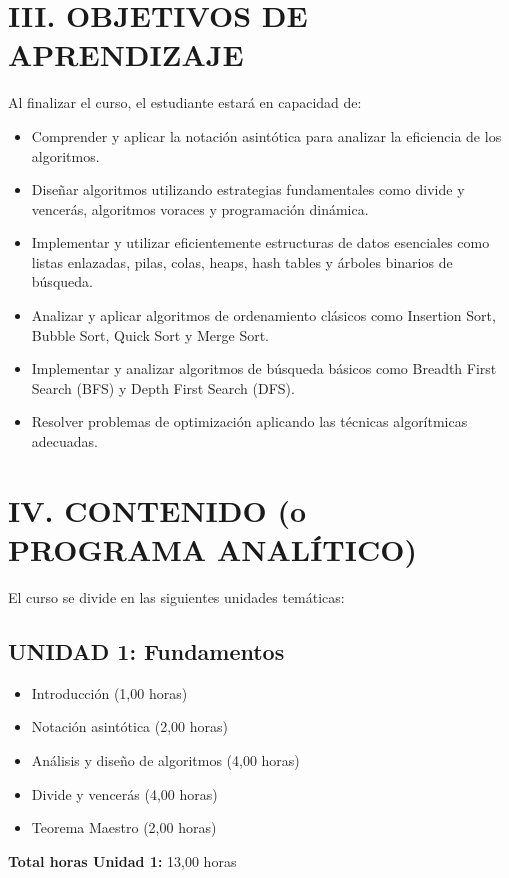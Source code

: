 \documentclass[12pt,a4paper]{article}
\begin{document}
\section*{III. OBJETIVOS DE APRENDIZAJE} %
Al finalizar el curso, el estudiante estará en capacidad de:
\begin{itemize}[leftmargin=*]
    \item Comprender y aplicar la notación asintótica para analizar la eficiencia de los algoritmos.
    \item Diseñar algoritmos utilizando estrategias fundamentales como divide y vencerás, algoritmos voraces y programación dinámica.
    \item Implementar y utilizar eficientemente estructuras de datos esenciales como listas enlazadas, pilas, colas, heaps, hash tables y árboles binarios de búsqueda.
    \item Analizar y aplicar algoritmos de ordenamiento clásicos como Insertion Sort, Bubble Sort, Quick Sort y Merge Sort.
    \item Implementar y analizar algoritmos de búsqueda básicos como Breadth First Search (BFS) y Depth First Search (DFS).
    \item Resolver problemas de optimización aplicando las técnicas algorítmicas adecuadas.
\end{itemize}
\vspace{0.5cm}

\section*{IV. CONTENIDO (o PROGRAMA ANALÍTICO)}
El curso se divide en las siguientes unidades temáticas:

\subsection*{UNIDAD 1: Fundamentos}
\begin{itemize}[leftmargin=*]
    \item Introducción (1,00 horas)
    \item Notación asintótica (2,00 horas)
    \item Análisis y diseño de algoritmos (4,00 horas)
    \item Divide y vencerás (4,00 horas)
    \item Teorema Maestro (2,00 horas)
\end{itemize}
\textbf{Total horas Unidad 1:} 13,00 horas
\end{document}
